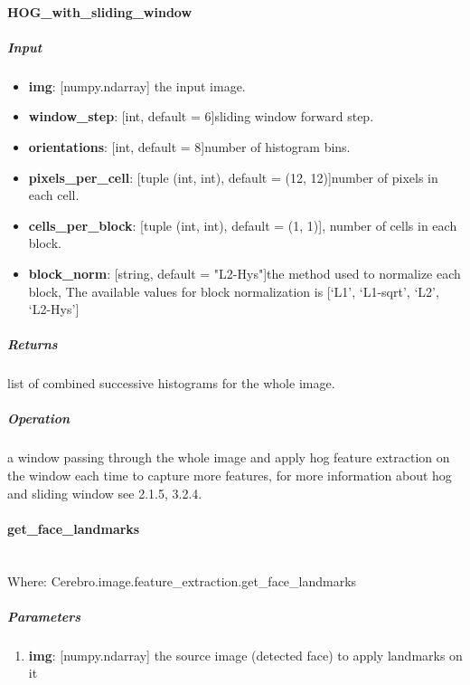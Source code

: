 \paragraph{HOG\_with\_sliding\_window}
\subparagraph{Input}
\begin{changemargin}{0.5cm}{0cm}
\begin{itemize}
\item  \textbf{img}: [numpy.ndarray] the input image.
\item  \textbf{window\_step}: [int, default = 6]sliding window forward step.
\item  \textbf{orientations}: [int, default = 8]number of histogram bins.
\item \textbf{pixels\_per\_cell}: [tuple (int, int), default = (12, 12)]number of pixels in each cell.
\item  \textbf{cells\_per\_block}: [tuple (int, int), default = (1, 1)], number of cells in each block.
\item  \textbf{block\_norm}: [string, default = "L2-Hys"]the method used to normalize each block, The available values for block normalization is [‘L1’, ‘L1-sqrt’, ‘L2’, ‘L2-Hys’]
\end{itemize}
\end{changemargin}

\subparagraph{Returns}
\begin{changemargin}{0.5cm}{0cm}
list of combined successive histograms for the whole image.
\end{changemargin}

\subparagraph{Operation} 
\begin{changemargin}{0.5cm}{0cm}
a window passing through the whole image and apply hog feature extraction on the window each time to capture more features, for more information about hog and sliding window see 2.1.5, 3.2.4.
\end{changemargin}

\newpage
\paragraph{get\_face\_landmarks} \mbox{}\\
Where: Cerebro.image.feature\_extraction.get\_face\_landmarks
\subparagraph{Parameters}
\begin{changemargin}{0.5cm}{0cm}
	\begin{enumerate} 
		\item \textbf{img}: [numpy.ndarray] the source image (detected face) to apply landmarks on it
	\end{enumerate}
\end{changemargin}

